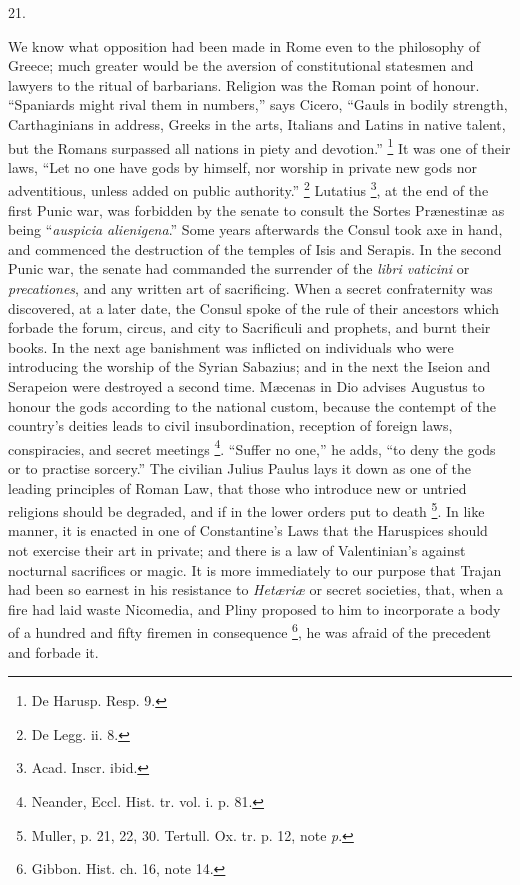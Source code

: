 21.

We know what opposition had been made in Rome even to
the philosophy of Greece; much greater would be the
aversion of constitutional statesmen and lawyers to the
ritual of barbarians. Religion was the Roman point of
honour. ``Spaniards might rival them in
numbers,'' says Cicero, ``Gauls in bodily
strength, Carthaginians in address, Greeks in the arts,
Italians and Latins in native talent, but the Romans
surpassed all nations in piety and devotion.'' \footnote{De Harusp. Resp. 9.} It
was one of their laws, ``Let no one have gods by
himself, nor worship in private new gods nor
adventitious, unless added on public authority.'' \footnote{De Legg. ii. 8.}
Lutatius \footnote{Acad. Inscr. ibid.}, at the end of the first Punic war, was
forbidden by the senate to consult the Sortes Prænestinæ as being ``\emph{auspicia alienigena}.''
Some years afterwards the Consul took axe in hand, and
commenced the destruction of the temples of Isis and
Serapis. In the second Punic war, the senate had
commanded the surrender of the \emph{libri vaticini} or \emph{precationes},
and any written art of sacrificing. When a secret
confraternity was discovered, at a later date, the Consul
spoke of the rule of their ancestors which forbade the
forum, circus, and city to Sacrificuli and prophets, and
burnt their books. In the next age banishment was
inflicted on individuals who were introducing the worship
of the Syrian Sabazius; and in the next the Iseion and
Serapeion were destroyed a second time. Mæcenas in Dio
advises Augustus to honour the gods according to the
national custom, because the contempt of the country's
deities leads to civil insubordination, reception of
foreign laws, conspiracies, and secret meetings \footnote{Neander, Eccl. Hist. tr. vol.
i. p. 81.}.
``Suffer no one,'' he adds, ``to deny the
gods or to practise sorcery.'' The civilian Julius
Paulus lays it down as one of the leading principles of
Roman Law, that those who introduce new or untried
religions should be degraded, and if in the lower orders
put to death \footnote{Muller, p. 21, 22, 30.
Tertull. Ox. tr. p. 12, note \emph{p}.}. In like manner, it is enacted in one of
Constantine's Laws that the Haruspices should not
exercise their art in private; and there is a law of
Valentinian's against nocturnal sacrifices or magic. It
is more immediately to our purpose that Trajan had been
so earnest in his resistance to \emph{ Hetæriæ} or secret
societies, that, when a fire had laid waste Nicomedia,
and Pliny proposed to him to incorporate a body of a
hundred and fifty firemen in consequence \footnote{Gibbon. Hist. ch. 16, note
14.}, he
was afraid of the precedent and forbade it.

